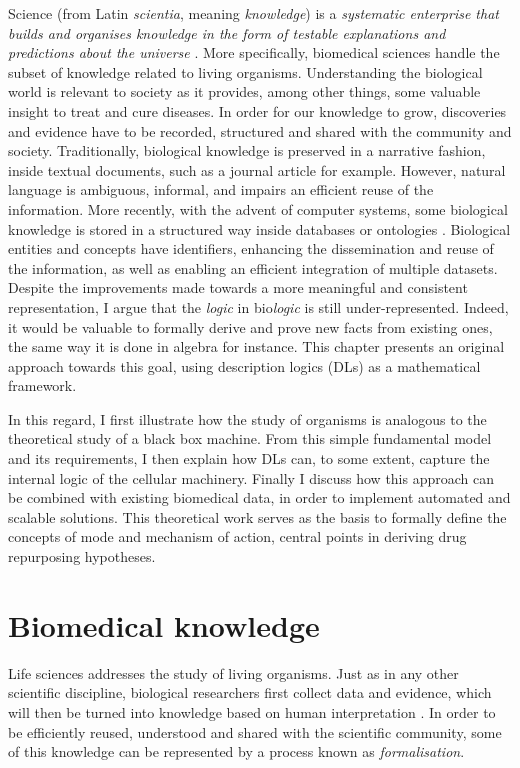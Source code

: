 Science (from Latin \emph{scientia}, meaning \emph{knowledge}) is a \emph{systematic enterprise that builds and organises knowledge in the form of testable explanations and predictions about the universe} \citep{sciencewiki}. More specifically, biomedical sciences handle the subset of knowledge related to living organisms. Understanding the biological world is relevant to society as it provides, among other things, some valuable insight to treat and cure diseases. In order for our knowledge to grow, discoveries and evidence have to be recorded, structured and shared with the community and society. Traditionally, biological knowledge is preserved in a narrative fashion, inside textual documents, such as a journal article for example. However, natural language is ambiguous, informal, and impairs an efficient reuse of the information. More recently, with the advent of computer systems, some biological knowledge is stored in a structured way inside databases or ontologies \citep{brooksbank2014european}. Biological entities and concepts have identifiers, enhancing the dissemination and reuse of the information, as well as enabling an efficient integration of multiple datasets. Despite the improvements made towards a more meaningful and consistent representation, I argue that the \emph{logic} in bio\emph{logic} is still under-represented. Indeed, it would be valuable to formally derive and prove new facts from existing ones, the same way it is done in algebra for instance. This chapter presents an original approach towards this goal, using description logics (DLs) as a mathematical framework.

In this regard, I first illustrate how the study of organisms is analogous to the theoretical study of a black box machine. From this simple fundamental model and its requirements, I then explain how DLs can, to some extent, capture the internal logic of the cellular machinery. Finally I discuss how this approach can be combined with existing biomedical data, in order to implement automated and scalable solutions. This theoretical work serves as the basis to formally define the concepts of mode and mechanism of action, central points in deriving drug repurposing hypotheses.

\section{Biomedical knowledge}

Life sciences addresses the study of living organisms. Just as in any other scientific discipline, biological researchers first collect data and evidence, which will then be turned into knowledge based on human interpretation \citep{antezana2009biological}. In order to be efficiently reused, understood and shared with the scientific community, some of this knowledge can be represented by a process known as \emph{formalisation}.

